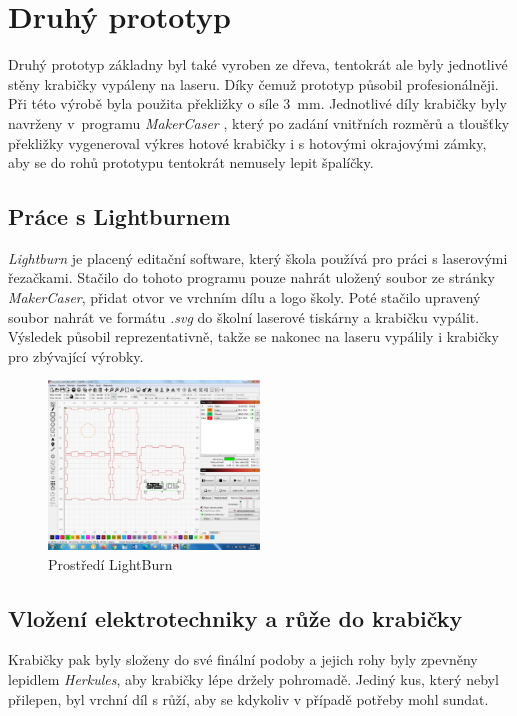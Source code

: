 \section{Druhý prototyp }
Druhý prototyp základny byl také vyroben ze dřeva, tentokrát ale byly jednotlivé stěny krabičky vypáleny na laseru. Díky čemuž prototyp působil profesionálněji. Při této výrobě byla použita překližky o síle 3~mm. Jednotlivé díly krabičky byly navrženy v~programu \textit{MakerCaser} \cite{makercase}, který po zadání vnitřních rozměrů a tloušťky překližky vygeneroval výkres hotové krabičky i s hotovými okrajovými zámky, aby se do rohů prototypu tentokrát nemusely lepit špalíčky. 

\subsection*{Práce s Lightburnem}
\textit{Lightburn} \cite{lightburn} je placený editační software, který škola používá pro práci s laserovými řezačkami. 
Stačilo do tohoto programu pouze nahrát uložený soubor ze stránky \textit{MakerCaser}, přidat otvor ve vrchním dílu a logo školy. Poté stačilo upravený soubor nahrát ve formátu \textit{.svg} do školní laserové tiskárny a krabičku vypálit. Výsledek působil reprezentativně, takže se nakonec na laseru vypálily i krabičky pro zbývající výrobky. 



\begin{figure}[htbp]
	\centering
	\includegraphics[width=0.5\textwidth]{img/06zakl/LightBurn_ukazka.jpg}
	\caption{Prostředí LightBurn}
\end{figure}

\subsection*{Vložení elektrotechniky a růže do krabičky}
Krabičky pak byly složeny do své finální podoby a jejich rohy byly zpevněny lepidlem \textit{Herkules}, aby krabičky lépe držely pohromadě. Jediný kus, který nebyl přilepen, byl vrchní díl s růží, aby se kdykoliv v případě potřeby mohl sundat. 


